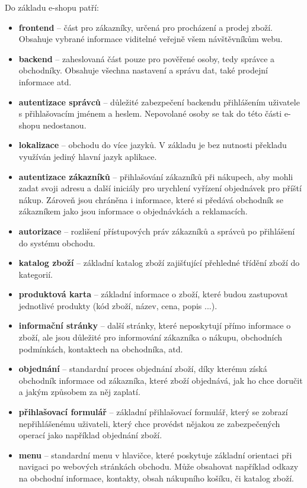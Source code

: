 \documentclass[11pt,twoside,a4paper]{book}
\begin{document}
Do základu e-shopu patří:
\begin{itemize}
\item \textbf{frontend} -- část pro zákazníky, určená pro procházení a prodej zboží. Obsahuje vybrané informace viditelné veřejně všem návštěvníkům webu.
\item \textbf{backend} -- zaheslovaná část pouze pro pověřené osoby, tedy správce a obchodníky. Obsahuje všechna nastavení a správu dat, také prodejní informace atd.
\item \textbf{autentizace správců} -- důležité zabezpečení backendu přihlášením uživatele s přihlašovacím jménem a heslem. Nepovolané osoby se tak do této části e-shopu nedostanou.
\item \textbf{lokalizace} -- obchodu do více jazyků. V základu je bez nutnosti překladu využíván jediný hlavní jazyk aplikace.
\item \textbf{autentizace zákazníků} -- přihlašování zákazníků při nákupech, aby mohli zadat svoji adresu a další iniciály pro urychlení vyřízení objednávek pro příští nákup. Zároveň jsou chráněna i informace, které si předává obchodník se zákazníkem jako jsou informace o objednávkách a reklamacích.
\item \textbf{autorizace} -- rozlišení přístupových práv zákazníků a správců po přihlášení do systému obchodu.
\item \textbf{katalog zboží} -- základní katalog zboží zajišťující přehledné třídění zboží do kategorií.
\item \textbf{produktová karta} -- základní informace o zboží, které budou zastupovat jednotlivé produkty (kód zboží, název, cena, popis ...).
\item \textbf{informační stránky} -- další stránky, které neposkytují přímo informace o zboží, ale jsou důležité pro informování zákazníka o nákupu, obchodních podmínkách, kontaktech na obchodníka, atd.
\item \textbf{objednání} -- standardní proces objednání zboží, díky kterému získá obchodník informace od zákazníka, které zboží objednává, jak ho chce doručit a jakým způsobem za něj zaplatí.
\item \textbf{přihlašovací formulář} -- základní přihlašovací formulář, který se zobrazí nepřihlášenému uživateli, který chce provédst nějakou ze zabezpečených operací jako například objednání zboží.
\item \textbf{menu} -- standardní menu v hlavičce, které poskytuje základní orientaci při navigaci po webových stránkách obchodu. Může obsahovat například odkazy na obchodní informace, kontakty, obsah nákupního košíku, či katalog zboží.

\end{itemize}
\end{document}
